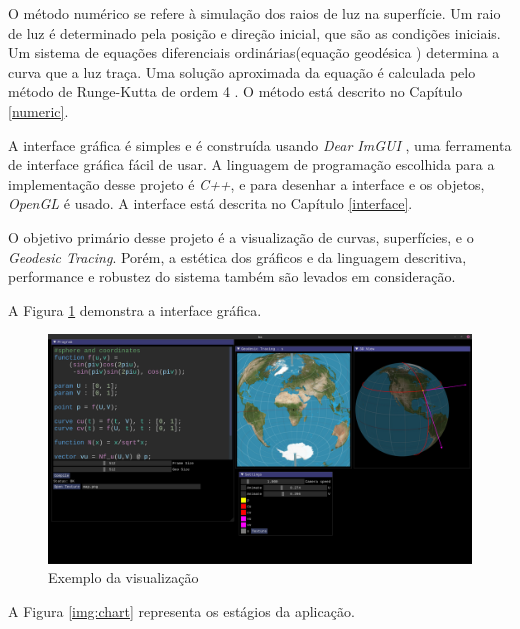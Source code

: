 O método numérico se refere à simulação dos raios de luz na superfície.
Um raio de luz é determinado pela posição e direção inicial, que são as condições iniciais.
Um sistema de equações diferenciais ordinárias(equação geodésica \cite{GeomDiff:1})
determina a curva que a luz traça.
Uma solução aproximada da equação é calculada pelo método de Runge-Kutta de ordem 4 \cite{Anal:1}.
O método está descrito no Capítulo \ref{numeric}.

A interface gráfica é simples e é construída usando \textit{Dear ImGUI} \cite{ImGui},
uma ferramenta de interface gráfica fácil de usar.
A linguagem de programação escolhida para a implementação desse projeto é \textit{C++},
e para desenhar a interface e os objetos, \textit{OpenGL} é usado.
A interface está descrita no Capítulo \ref{interface}.

O objetivo primário desse projeto é a visualização de curvas, superfícies, e o \textit{Geodesic Tracing}.
Porém, a estética dos gráficos e da linguagem descritiva, performance
e robustez do sistema também são levados em consideração.

A Figura \ref{img:preview} demonstra a interface gráfica.

\begin{figure}[!ht]
    \centering
    \includegraphics[width=\linewidth, frame]{preview.png}
    \caption{Exemplo da visualização}
    \label{img:preview}
\end{figure}

\newpage

A Figura \ref{img:chart} representa os estágios da aplicação.

